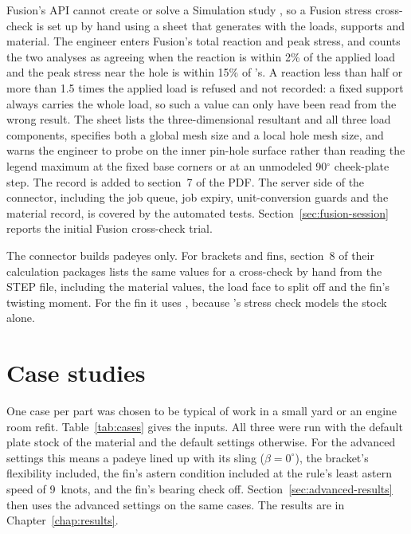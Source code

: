 Fusion's API cannot create or solve a Simulation study \cite{autodeskAddins},
so a Fusion stress cross-check is set up by hand using a sheet that \NEMO{}
generates with the loads, supports and material. The engineer enters Fusion's
total reaction and peak stress, and \NEMO{} counts the two analyses as agreeing
when the reaction is within 2\% of the applied load and the peak stress near
the hole is within 15\% of \NEMO{}'s. A reaction less than half or more than
1.5 times the applied load is refused and not recorded: a fixed support always
carries the whole load, so such a value can only have been read from the wrong
result. The sheet lists the three-dimensional resultant and all three load
components, specifies both a global mesh size and a local hole mesh size, and
warns the engineer to probe on the inner pin-hole surface rather than reading
the legend maximum at the fixed base corners or at an unmodeled 90$^\circ$
cheek-plate step. The record is added to section~7 of the PDF. The server side
of the connector, including the job queue, job expiry, unit-conversion guards
and the material record, is covered by the automated tests.
Section~\ref{sec:fusion-session} reports the initial Fusion cross-check trial.

The connector builds padeyes only. For brackets and fins, section~8 of their
calculation packages lists the same values for a cross-check by hand from the
STEP file, including the material values, the load face to split off and the
fin's twisting moment. For the fin it uses , because
\NEMO{}'s stress check models the stock alone.

\section{Case studies}
\label{sec:case-studies}

One case per part was chosen to be typical of work in a small yard or an
engine room refit. Table~\ref{tab:cases} gives the inputs. All three were run
with the default plate stock of the material and the default settings
otherwise. For the advanced settings this means a padeye lined up with its
sling ($\beta = 0^\circ$), the bracket's flexibility included, the fin's
astern condition included at the rule's least astern speed of 9~knots, and the
fin's bearing check off. Section~\ref{sec:advanced-results} then uses the
advanced settings on the same cases. The results are in
Chapter~\ref{chap:results}.

